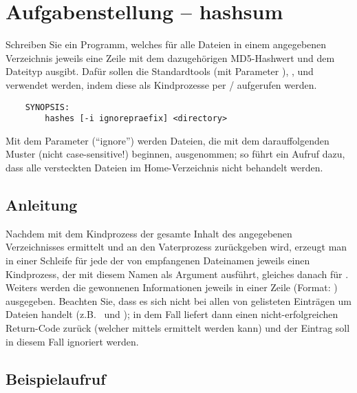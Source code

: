 




\section*{Aufgabenstellung -- hashsum}

Schreiben Sie ein Programm, welches für alle Dateien in einem angegebenen
Verzeichnis jeweils eine Zeile mit dem dazugehörigen MD5-Hashwert und dem
Dateityp ausgibt. Dafür sollen die Standardtools  (mit Parameter
), , und  verwendet werden, indem
diese als Kindprozesse per / aufgerufen
werden.

\begin{verbatim}
    SYNOPSIS:
        hashes [-i ignorepraefix] <directory>
\end{verbatim}

Mit dem Parameter  (``ignore'') werden Dateien, die mit dem
darauffolgenden Muster (nicht case-sensitive!) beginnen, ausgenommen;
so führt ein Aufruf  dazu, dass alle versteckten
Dateien im Home-Verzeichnis nicht behandelt werden.

\subsection*{Anleitung}
Nachdem mit dem Kindprozess  der gesamte Inhalt des angegebenen
Verzeichnisses ermittelt und an den Vaterprozess zurückgeben wird, erzeugt man
in einer Schleife für jede der von  empfangenen Dateinamen jeweils
einen Kindprozess, der  mit diesem Namen als Argument ausführt,
gleiches danach für . Weiters werden die gewonnenen Informationen
jeweils in einer Zeile (Format: )
ausgegeben. Beachten Sie, dass es sich nicht bei allen von 
gelisteten Einträgen um Dateien handelt (z.B.\  und
); in dem Fall liefert dann  einen
nicht-erfolgreichen Return-Code zurück (welcher mittels
 ermittelt werden kann) und der Eintrag
soll in diesem Fall ignoriert werden.

\subsection*{Beispielaufruf}

